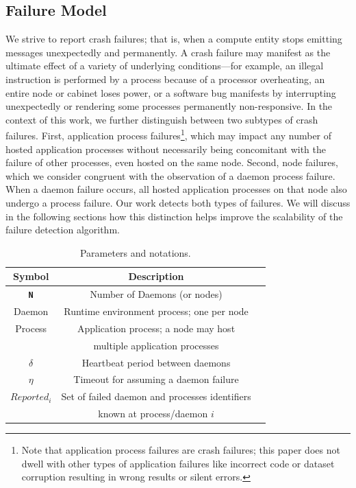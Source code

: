 \documentclass[5p,times,twocolumn]{elsarticle}
\begin{document}
\subsection{Failure Model}

We strive to report crash failures; that is, when a compute entity stops emitting
messages unexpectedly and permanently. A crash failure may manifest as
the ultimate effect of a variety of underlying conditions---for example, an illegal instruction
is performed by a process because of a processor overheating, an entire
node or cabinet loses power, or a software bug manifests by interrupting
unexpectedly or rendering some processes permanently non-responsive. In the context of
this work, we further distinguish between two subtypes of crash failures.
First, application process failures\footnote{Note that application process failures are crash failures; this paper does not dwell with other types of application failures like incorrect code or dataset corruption resulting in wrong results or silent errors.}, which may impact any number of
hosted application processes without necessarily being concomitant
with the failure of other processes, even hosted on the same node.
Second, node failures, which we consider congruent with the observation of a daemon
process failure. When a daemon failure occurs, all hosted application processes on
that node also undergo a process failure. Our work detects both types of
failures. We will discuss in the following
sections how this distinction helps improve the scalability of the failure
detection algorithm.

\begin{table}
  \caption{Parameters and notations.}\label{fig:notations}
  \label{tab:parameters}
  \small
  \begin{tabular}{ccl}
    \toprule
    Symbol & Description \\
    \midrule
    \texttt{\bf N} & Number of Daemons (or nodes) \\
    Daemon & Runtime environment process; one per node\\
    Process & Application process; a node may host \\& multiple application processes \\
    $\delta$ & Heartbeat period between daemons\\
    $\eta$ & Timeout for assuming a daemon failure\\
    $Reported_i$ & Set of failed daemon and processes identifiers\\
                 & known at process/daemon $i$ \\
    \bottomrule
  \end{tabular}
\end{table}
\end{document}
